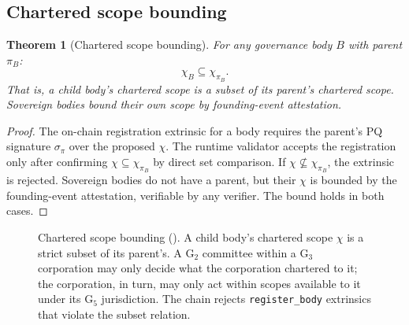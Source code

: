 \documentclass[11pt,a4paper,parskip=half-,DIV=12,headings=standardclasses]{scrartcl}
\theoremstyle{ncthm}
\newtheorem{theorem}{Theorem}[section]
\theoremstyle{ncdef}
\begin{document}
\subsection{Chartered scope bounding}

\begin{theorem}[Chartered scope bounding]\label{thm:scope-bounding}
For any governance body $B$ with parent $\pi_B$:
\[
\chi_B \subseteq \chi_{\pi_B}.
\]
That is, a child body's chartered scope is a subset of its parent's
chartered scope. Sovereign bodies bound their own scope by
founding-event attestation.
\end{theorem}

\begin{proof}
The on-chain registration extrinsic for a body requires the parent's
PQ signature $\sigma_\pi$ over the proposed $\chi$. The runtime
validator accepts the registration only after confirming
$\chi \subseteq \chi_{\pi_B}$ by direct set comparison. If
$\chi \not\subseteq \chi_{\pi_B}$, the extrinsic is rejected.
Sovereign bodies do not have a parent, but their $\chi$ is bounded by
the founding-event attestation, verifiable by any verifier. The
bound holds in both cases.
\end{proof}

\begin{figure}[h]
\centering
{}
\caption{Chartered scope bounding (). A child
body's chartered scope $\chi$ is a strict subset of its parent's. A
G$_2$ committee within a G$_3$ corporation may only decide what the
corporation chartered to it; the corporation, in turn, may only act
within scopes available to it under its G$_5$ jurisdiction. The
chain rejects \texttt{register\_body} extrinsics that violate the
subset relation.}
\label{fig:scope-bounding}
\end{figure}
\end{document}
